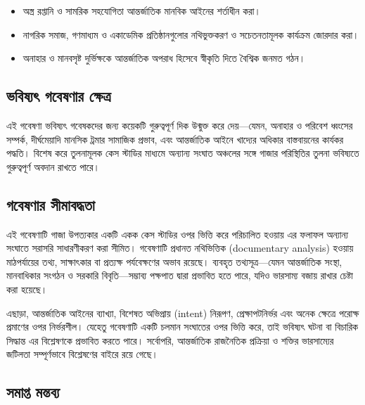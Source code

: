 \begin{itemize}
\item
  অস্ত্র রপ্তানি ও সামরিক সহযোগিতা আন্তর্জাতিক মানবিক আইনের শর্তাধীন করা।
\item
  নাগরিক সমাজ, গণমাধ্যম ও একাডেমিক প্রতিষ্ঠানগুলোর নথিভুক্তকরণ ও সচেতনতামূলক
  কার্যক্রম জোরদার করা।
\item
  অনাহার ও মানবসৃষ্ট দুর্ভিক্ষকে আন্তর্জাতিক অপরাধ হিসেবে স্বীকৃতি দিতে বৈশ্বিক
  জনমত গঠন।
\end{itemize}

\subsection{ভবিষ্যৎ গবেষণার
ক্ষেত্র}\label{ux9adux9acux9b7ux9afux9ce-ux997ux9acux9b7ux9a3ux9b0-ux995ux9b7ux9a4ux9b0}

এই গবেষণা ভবিষ্যৎ গবেষকদের জন্য কয়েকটি গুরুত্বপূর্ণ দিক উন্মুক্ত করে দেয়---যেমন,
অনাহার ও পরিবেশ ধ্বংসের সম্পর্ক, দীর্ঘমেয়াদি মানসিক ট্রমার সামাজিক প্রভাব, এবং
আন্তর্জাতিক আইনে খাদ্যের অধিকার বাস্তবায়নের কার্যকর পদ্ধতি। বিশেষ করে তুলনামূলক
কেস স্টাডির মাধ্যমে অন্যান্য সংঘাত অঞ্চলের সঙ্গে গাজার পরিস্থিতির তুলনা ভবিষ্যতে
গুরুত্বপূর্ণ অবদান রাখতে পারে।

\subsection{\texorpdfstring{গবেষণার সীমাবদ্ধতা
}{৬.৪ গবেষণার সীমাবদ্ধতা }}\label{ux997ux9acux9b7ux9a3ux9b0-ux9b8ux9aeux9acux9a6ux9a7ux9a4}

এই গবেষণাটি গাজা উপত্যকার একটি একক কেস স্টাডির ওপর ভিত্তি করে পরিচালিত
হওয়ায় এর ফলাফল অন্যান্য সংঘাতে সরাসরি সাধারণীকরণ করা সীমিত। গবেষণাটি
প্রধানত নথিভিত্তিক (documentary analysis) হওয়ায় মাঠপর্যায়ের তথ্য, সাক্ষাৎকার
বা প্রত্যক্ষ পর্যবেক্ষণের অভাব রয়েছে। ব্যবহৃত তথ্যসূত্র---যেমন আন্তর্জাতিক সংস্থা,
মানবাধিকার সংগঠন ও সরকারি বিবৃতি---সম্ভাব্য পক্ষপাত দ্বারা প্রভাবিত হতে পারে,
যদিও ভারসাম্য বজায় রাখার চেষ্টা করা হয়েছে।

এছাড়া, আন্তর্জাতিক আইনের ব্যাখ্যা, বিশেষত অভিপ্রায় (intent) নিরূপণ,
প্রেক্ষাপটনির্ভর এবং অনেক ক্ষেত্রে পরোক্ষ প্রমাণের ওপর নির্ভরশীল। যেহেতু গবেষণাটি
একটি চলমান সংঘাতের ওপর ভিত্তি করে, তাই ভবিষ্যৎ ঘটনা বা বিচারিক সিদ্ধান্ত এর
বিশ্লেষণকে প্রভাবিত করতে পারে। সর্বোপরি, আন্তর্জাতিক রাজনৈতিক প্রক্রিয়া ও শক্তির
ভারসাম্যের জটিলতা সম্পূর্ণভাবে বিশ্লেষণের বাইরে রয়ে গেছে।

\subsection{\texorpdfstring{সমাপ্ত মন্তব্য
}{৬.৫ সমাপ্ত মন্তব্য }}\label{ux9b8ux9aeux9aaux9a4-ux9aeux9a8ux9a4ux9acux9af}

